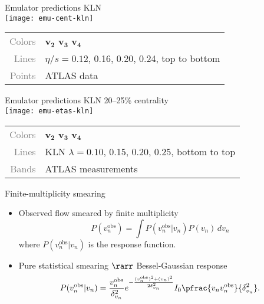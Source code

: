 \documentclass{beamer}
\begin{document}
\begin{frame}{Emulator predictions}
  \centering\vspace{1ex}
  \hspace{1ex} KLN \\[1ex]
  \texttt{[image: emu-cent-kln]} \\
  \small
  \begin{tabular}{rl}
    \textcolor{grey}{Colors} &
    \textcolor{vnbl}{$\boldsymbol{v_2}$}
    \textcolor{vngr}{$\boldsymbol{v_3}$}
    \textcolor{vnor}{$\boldsymbol{v_4}$} \\
    \textcolor{grey}{Lines} & $\eta/s = 0.12$, 0.16, 0.20, 0.24, top to bottom \\
    \textcolor{grey}{Points} & ATLAS data
  \end{tabular}
\end{frame}



\begin{frame}{Emulator predictions}
  \centering\vspace{1ex}
  \hspace{3ex} KLN 20--25\% centrality \\[1ex]
  \texttt{[image: emu-etas-kln]} \\
  \small
  \begin{tabular}{rl}
    \textcolor{grey}{Colors} &
    \textcolor{vnbl}{$\boldsymbol{v_2}$}
    \textcolor{vngr}{$\boldsymbol{v_3}$}
    \textcolor{vnor}{$\boldsymbol{v_4}$} \\
    \textcolor{grey}{Lines} & KLN $\lambda = 0.10$, 0.15, 0.20, 0.25, bottom to top \\
    \textcolor{grey}{Bands} & ATLAS measurements
  \end{tabular}
\end{frame}


\begin{frame}{Finite-multiplicity smearing}
  \def\obs{^\text{obs}}

  \begin{itemize}
    \item Observed flow smeared by finite multiplicity
      \begin{equation*}
        P(v_n\obs) = \int P(v_n\obs|v_n) P(v_n) \, dv_n
      \end{equation*}
      where $P(v_n\obs|v_n)$ is the response function.
    \item Pure statistical smearing $\rarr$ Bessel-Gaussian response
      \begin{equation*}
        P(v_n^\text{obs}|v_n) = \frac{v_n^\text{obs}}{\delta_{v_n}^2} e^{ -\frac{(v_n^\text{obs})^2 + (v_n)^2}{2\delta_{v_n}^2} }
          I_0 \pfrac{v_nv_n^\text{obs}}{\delta_{v_n}^2}.
      \end{equation*}
  \end{itemize}
\end{frame}
\end{document}

